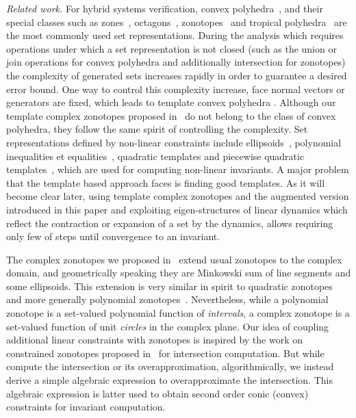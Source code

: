 

\emph{Related work.} For hybrid systems verification, convex polyhedra~\cite{CousotHalbwachs78,jeannet2009apron}, and their special classes such as
zones~\cite{DBLP:conf/pado/Mine01},
octagons~\cite{DBLP:journals/lisp/Mine06}, zonotopes~\cite{DBLP:conf/hybrid/Girard05,DBLP:conf/eucc/MaigaCRT14} and
tropical polyhedra~\cite{DBLP:conf/sas/AllamigeonGG08} are the most
commonly used set representations. During the analysis which requires
operations under which a set representation is not closed (such as the
union or join operations for convex polyhedra and additionally
intersection for zonotopes) the complexity of generated sets increases
rapidly in order to guarantee a desired error bound. One way to
control this complexity increase, face normal vectors or generators
are fixed, which leads to template convex
polyhedra \cite{Sankaranarayanan+Dang+Ivancic-08-Symbolic,DBLP:conf/aplas/DangG11}. Although
our template complex zonotopes proposed in~\cite{tcz2017} do not
belong to the class of convex polyhedra, they follow the same
spirit of controlling the complexity. Set representations defined by non-linear constraints include
ellipsoids~\cite{Kurzhanski2000201}, polynomial
inequalities\cite{DBLP:conf/sas/BagnaraRZ05} et
equalities~\cite{Rodriguez-Carbonell:2007}, quadratic templates and
piecewise quadratic
templates~\cite{DBLP:conf/esop/AdjeGG10,DBLP:conf/hybrid/RouxJGF12,DBLP:conf/fm/RouxG14,DBLP:conf/hybrid/Adje17},
which are used for computing non-linear invariants. A major problem
that the template based approach faces is finding good templates. As
it will become clear later, using template complex zonotopes and the
augmented version introduced in this paper and exploiting
eigen-structures of linear dynamics which reflect the contraction or
expansion of a set by the dynamics, allows requiring only few of steps
until convergence to an invariant.

The complex zonotopes we proposed in~\cite{adimoolamACC2016} extend
usual zonotopes to the complex domain, and geometrically speaking they
are Minkowski sum of line segments and some ellipsoids. This extension
is very similar in spirit to quadratic
zonotopes~\cite{DBLP:conf/aplas/AdjeGW15} and more generally
polynomial zonotopes~\cite{DBLP:conf/hybrid/Althoff13}. Nevertheless,
while a polynomial zonotope is a set-valued polynomial function
of \emph{intervals}, a complex zonotope is a set-valued function of
unit \emph{circles} in the complex plane. Our idea of coupling
additional linear constraints with zonotopes is inspired by the work
on constrained zonotopes proposed
in~\cite{DBLP:conf/cav/GhorbalGP09,scott2016constrained} for
intersection computation.  But
while~\cite{DBLP:conf/cav/GhorbalGP09,scott2016constrained} compute
the intersection or its overapproximation, algorithmically, we instead
derive a simple algebraic expression to overapproximate the
intersection.  This algebraic expression is latter used to
obtain second order conic (convex) constraints for invariant computation.\\

